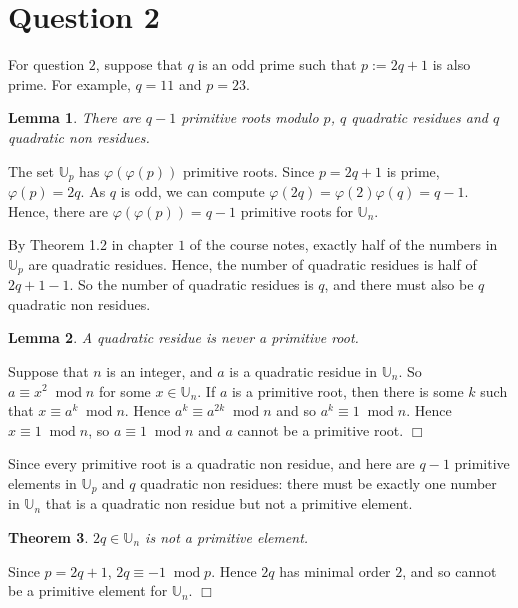 \documentclass[10pt]{article}
\newtheorem{theorem}{Theorem}
\newtheorem{lemma}[theorem]{Lemma}
\newenvironment{proof}[1][Proof]{\begin{trivlist}
\item[\hskip \labelsep {\bfseries #1}]}{\end{trivlist}}
\newcommand{\modulo}[1]{\;\operatorname{mod} #1}
\begin{document}
    \section*{Question 2}
    For question $2$, suppose that $q$ is an odd prime such that $p := 2q+1$
    is also prime. For example, $q = 11$ and $p = 23$. 
    \begin{lemma}
        There are $q-1$ primitive roots modulo $p$, $q$ quadratic
        residues and $q$ quadratic non residues.
    \end{lemma}
    \begin{proof}
        The set $\mathbb{U}_p$ has $\varphi(\varphi(p))$ primitive roots. 
        Since $p = 2q+1$ is prime, $\varphi(p) = 2q$. As $q$ is odd, 
        we can compute $\varphi(2q) = \varphi(2)\varphi(q) = q-1$.
        Hence, there are $\varphi(\varphi(p)) = q-1$ primitive
        roots for $\mathbb{U}_n$.
        
        By Theorem 1.2 in chapter $1$ of the course notes, exactly
        half of the numbers in $\mathbb{U}_p$ are quadratic residues.
        Hence, the number of quadratic residues is half of $2q+1-1$. So
        the number of quadratic residues is $q$, and there must 
        also be $q$ quadratic non residues.
    \end{proof}
    \begin{lemma}
        A quadratic residue is never a primitive root.
    \end{lemma}
    \begin{proof}
        Suppose that $n$ is an integer, and $a$ is a quadratic
        residue in $\mathbb{U}_n$. So $a \equiv x^2\modulo{n}$
        for some $x\in\mathbb{U}_n$. If $a$ is a primitive root,
        then there is some $k$ such that $x \equiv a^k\modulo{n}$.
        Hence $a^k \equiv a^{2k}\modulo{n}$ and so $a^k \equiv 1\modulo{n}$. 
        Hence $x\equiv 1\modulo{n}$, so $a \equiv 1\modulo{n}$ and $a$
        cannot be a primitive root. $\Box$
    \end{proof}
    
    Since every primitive root is a quadratic non residue, 
    and here are $q-1$ primitive elements in $\mathbb{U}_p$ and $q$
    quadratic non residues: there must be exactly one
    number in $\mathbb{U}_n$ that is a quadratic non residue but
    not a primitive element.
    
    \begin{theorem}
        $2q \in \mathbb{U}_n$ is not a primitive element.
    \end{theorem}
    \begin{proof}
        Since $p = 2q+1$, $2q\equiv -1\modulo{p}$. Hence $2q$
        has minimal order $2$, and so cannot be a primitive element
        for $\mathbb{U}_n$. $\Box$
    \end{proof}
    
\end{document}
